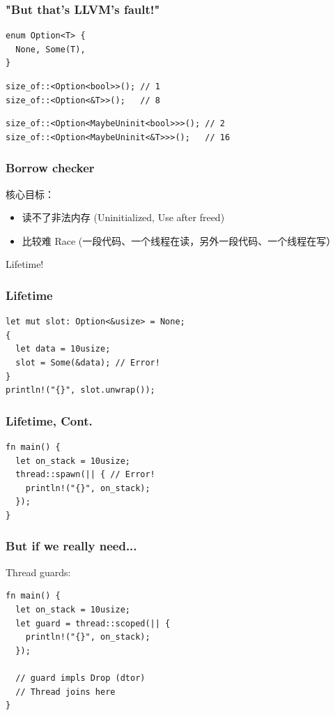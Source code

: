 \documentclass[UTF-8]{ctexbeamer}
\begin{document}
\begin{frame}[fragile]
  \frametitle{"But that's LLVM's fault!"}

  \begin{verbatim}
enum Option<T> {
  None, Some(T),
}
  \end{verbatim}
  \begin{verbatim}
size_of::<Option<bool>>(); // 1
size_of::<Option<&T>>();   // 8
  \end{verbatim}

  \pause

  \begin{verbatim}
size_of::<Option<MaybeUninit<bool>>>(); // 2
size_of::<Option<MaybeUninit<&T>>>();   // 16
  \end{verbatim}
\end{frame}

\begin{frame}
  \frametitle{Borrow checker}

  核心目标：
  \begin{itemize}
    \item 读不了非法内存 (Uninitialized, Use after freed)
    \item 比较难 Race (一段代码、一个线程在读，另外一段代码、一个线程在写）
  \end{itemize}

  \pause
  \vspace{1em}

  Lifetime!
\end{frame}

\begin{frame}[fragile]
  \frametitle{Lifetime}

  \begin{verbatim}
let mut slot: Option<&usize> = None;
{
  let data = 10usize;
  slot = Some(&data); // Error!
}
println!("{}", slot.unwrap());
  \end{verbatim}
\end{frame}

\begin{frame}[fragile]
  \frametitle{Lifetime, Cont.}

  \begin{verbatim}
fn main() {
  let on_stack = 10usize;
  thread::spawn(|| { // Error!
    println!("{}", on_stack);
  });
}
  \end{verbatim}
\end{frame}

\begin{frame}[fragile]
  \frametitle{But if we really need...}

  \pause

  Thread guards:

  \begin{verbatim}
fn main() {
  let on_stack = 10usize;
  let guard = thread::scoped(|| {
    println!("{}", on_stack);
  });

  // guard impls Drop (dtor)
  // Thread joins here
}
    
  \end{verbatim}
\end{frame}
\end{document}
